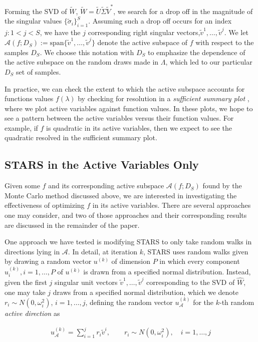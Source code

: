 \documentclass{amsart}
\newcommand{\A}{\mathcal{A}}
\begin{document}
Forming the SVD of $\tilde{W}$, $\tilde{W}=\tilde{U}\tilde{\Sigma}\tilde{V}^*$, we search for a drop off in the magnitude of the singular values $\{\tilde{\sigma}_i\}_{i=1}^S$. Assuming such a drop off occurs for an index $j:1<j<S$, we have the $j$ corresponding right singular vectors,$ \tilde{v}^1,\ldots,\tilde{v}^{j}$.  We let $\A\left(f; D_S \right):=\text{span}\{\tilde{v}^1,\ldots,\tilde{v}^{j}\}$ denote the active subspace of $f$ with respect to the samples $D_S$. We choose this notation with $D_S$ to emphasize the dependence of the active subspace on the random draws made in $\Lambda$, which led to our particular $D_S$ set of samples.

In practice, we can check the extent to which the active subspace accounts for functions values $f(\lambda)$ 
by checking for resolution in a \emph{sufficient summary plot} \cite{Constantine2015}, where we plot active variables against function values. In these plots, we hope to see a pattern between the active variables versus their function values. For example, if $f$ is quadratic in its active variables, then we expect to see the quadratic resolved in the sufficient summary plot. %

\subsection{STARS in the Active Variables Only} Given some $f$ and its corresponding active subspace $\A(f;D_S)$ found by the Monte Carlo method discussed above, we are interested in investigating the effectiveness of optimizing $f$ in its active variables. There are several approaches one may consider, and two of those approaches and their corresponding results are discussed in the remainder of the paper. 

One approach we have tested is modifying STARS to only take random walks in directions lying in $\A$. In detail, at iteration $k$, STARS uses random walks given by drawing a random vector $u^{(k)}$ of dimension $P$ in which every component $u_i^{(k)},i=1,\ldots,P$ of $u^{(k)}$ is  drawn from a specified normal distribution. Instead, given the first $j$ singular unit vectors $\tilde{v}^1,\ldots,\tilde{v}^j$ corresponding to the SVD of $\hat{W}$, one may take $j$ draws from a specified normal distribution, which we denote $r_i\sim N(0,\omega_i^2)$, $i=1,\ldots,j$, defining the random vector $u_\A^{(k)}$ for the $k$-th random \textit{active direction} as 

\begin{eqnarray}\label{eq:17}
u_\A^{(k)}=\sum_{i=1}^j r_i\tilde{v}^i, \quad \quad r_i\sim N(0,\omega_i^2), \quad i=1,\ldots,j
\end{eqnarray}
\end{document}
